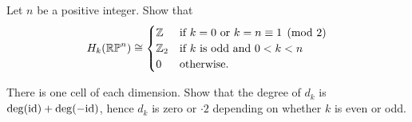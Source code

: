 \begin{dproblem}
	\gim
	Let $n$ be a positive integer. Show that
	\[
		H_k(\mathbb{RP}^n)
		\cong
		\begin{cases}
			\mathbb Z & \text{if $k=0$ or $k=n\equiv 1 \pmod 2$} \\
			\mathbb Z_{2} & \text{if $k$ is odd and $0 < k < n$} \\
			0 & \text{otherwise}.
		\end{cases}
	\]
	\begin{hint}
		There is one cell of each dimension.
		Show that the degree of $d_k$ is $\deg(\mathrm{id})+\deg(-\mathrm{id})$,
		hence $d_k$ is zero or $\cdot 2$ depending
		on whether $k$ is even or odd.
	\end{hint}
\end{dproblem}

